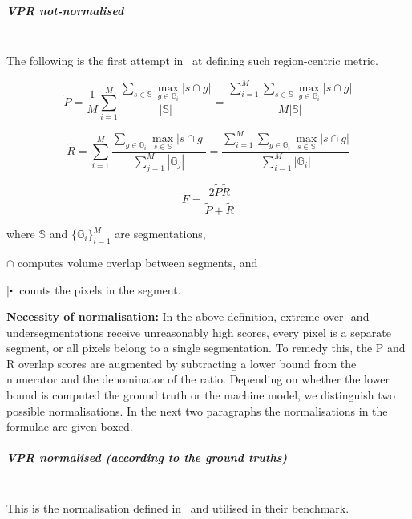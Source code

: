 \subparagraph{VPR not-normalised}\mbox{}\\
The following is the first attempt in~\cite{Galasso13} at defining such region-centric metric.

\begin{equation}
\tilde{P}=\frac{1}{M}\sum\limits _{i=1}^{M}\frac{\sum\limits _{s\in\mathbb{S}}\max\limits _{g\in\mathbb{G}_{i}}\left|s\cap g\right|}{\left|\mathbb{S}\right|}=\frac{\sum\limits _{i=1}^{M}\sum\limits _{s\in\mathbb{S}}\max\limits _{g\in\mathbb{G}_{i}}\left|s\cap g\right|}{M\left|\mathbb{S}\right|}
\end{equation}

\begin{equation}
\tilde{R}=\sum\limits _{i=1}^{M}\frac{\sum\limits _{g\in\mathbb{G}_{i}}\max\limits _{s\in\mathbb{S}}\left|s\cap g\right|}{\sum\limits _{j=1}^{M}\left|\mathbb{G}_{j}\right|}=\frac{\sum\limits _{i=1}^{M}\sum\limits _{g\in\mathbb{G}_{i}}\max\limits _{s\in\mathbb{S}}\left|s\cap g\right|}{\sum\limits _{i=1}^{M}\left|\mathbb{G}_{i}\right|}
\end{equation}


\begin{equation}
\tilde{F}=\frac{2\tilde{P}\tilde{R}}{\tilde{P}+\tilde{R}}
\end{equation}

where $\mathbb{S}$ and $\{\mathbb{G}_{i}\}_{i=1}^{M}$ are segmentations,

$\cap$ computes volume overlap between segments, and 

$\left|\centerdot\right|$ counts the pixels in the segment.%

\textbf{Necessity of normalisation:} In the above definition, extreme over- and undersegmentations receive unreasonably high scores, \ie every pixel is a separate segment, or all pixels belong to a single segmentation. To remedy this, the P and R overlap scores are augmented by subtracting a lower bound from the numerator and the denominator of the ratio. Depending on whether the lower bound is computed \wrt the ground truth or the machine model, we distinguish two possible normalisations. In the next two paragraphs the normalisations in the formulae are given boxed.

\subparagraph{VPR normalised (according to the ground truths)}\mbox{}\\ %
This is the normalisation defined in~\cite{Galasso13} and utilised %
in their benchmark.

